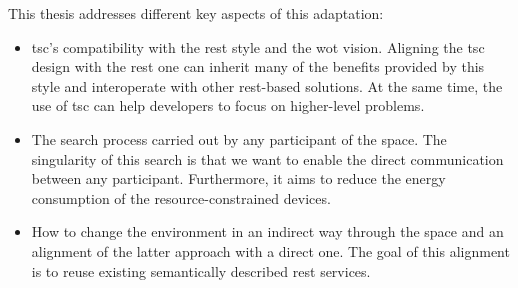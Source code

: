 This thesis addresses different key aspects of this adaptation:
\begin{itemize}
  \item \ac{tsc}'s compatibility with the \acs{rest} style and the \ac{wot} vision.
	Aligning the \ac{tsc} design with the \ac{rest} one can inherit many of the benefits provided by this style and interoperate with other \ac{rest}-based solutions.
	At the same time, the use of \ac{tsc} can help developers to focus on higher-level problems.
  \item The search process carried out by any participant of the space.
	The singularity of this search is that we want to enable the direct communication between any participant.
	Furthermore, it aims to reduce the energy consumption of the resource-constrained devices.
  \item How to change the environment in an indirect way through the space and an alignment of the latter approach with a direct one.
	The goal of this alignment is to reuse existing semantically described \ac{rest} services.
\end{itemize}
